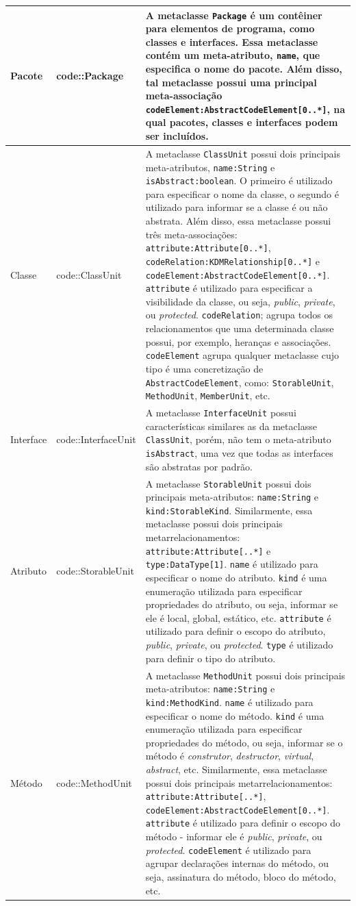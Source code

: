 \begin{longtable}[c]{| m{1.9cm} | m{3.57cm}| m{9.3cm} |}
 Pacote & code::Package & A metaclasse \texttt{Package} é um contêiner para elementos de programa, como classes e interfaces. Essa metaclasse contém um meta-atributo, \texttt{name}, que especifica o nome do pacote. Além disso, tal metaclasse possui uma principal meta-associação \texttt{codeElement:AbstractCodeElement[0..*]}, na qual pacotes, classes e interfaces podem ser incluídos. \\ 
\hline
Classe & code::ClassUnit & A metaclasse \texttt{ClassUnit} possui dois principais meta-atributos,  \texttt{name:String} e \texttt{isAbstract:boolean}. O primeiro é utilizado para especificar o nome da classe, o segundo é utilizado para informar se a classe é ou não abstrata. Além disso, essa metaclasse possui três meta-associações: \texttt{attribute:Attribute[0..*]}, \texttt{codeRelation:KDMRelationship[0..*]} e  \texttt{codeElement:AbstractCodeElement[0..*]}. \texttt{attribute} é utilizado para especificar a  visibilidade da classe, ou seja, \textit{public}, \textit{private}, ou \textit{protected}. \texttt{codeRelation}; agrupa todos os relacionamentos que uma determinada classe possui, por exemplo, heranças e associações. \texttt{codeElement} agrupa qualquer metaclasse cujo tipo é uma concretização de \texttt{AbstractCodeElement}, como: \texttt{StorableUnit}, \texttt{MethodUnit}, \texttt{MemberUnit}, etc. \\ 
\hline
Interface & code::InterfaceUnit & A metaclasse \texttt{InterfaceUnit} possui características similares as da metaclasse \texttt{ClassUnit}, porém, não tem o meta-atributo \texttt{isAbstract}, uma vez que todas as interfaces são abstratas por padrão. \\ 
\hline
Atributo & code::StorableUnit & A metaclasse \texttt{StorableUnit} possui dois principais meta-atributos: \texttt{name:String} e \texttt{kind:StorableKind}. Similarmente, essa metaclasse possui dois principais metarrelacionamentos: \texttt{attribute:Attribute[..*]} e \texttt{type:DataType[1]}. \texttt{name} é utilizado para especificar o nome do atributo. \texttt{kind} é uma enumeração utilizada para especificar propriedades do atributo, ou seja, informar se ele é local, global, estático, etc. \texttt{attribute} é utilizado para definir o escopo do atributo, \textit{public}, \textit{private}, ou \textit{protected}. \texttt{type} é utilizado para definir o tipo do atributo.  \\ 
\hline
Método & code::MethodUnit & A metaclasse \texttt{MethodUnit} possui dois principais meta-atributos: \texttt{name:String} e \texttt{kind:MethodKind}. \texttt{name} é utilizado para especificar o nome do método. \texttt{kind} é uma enumeração utilizada para especificar propriedades do método, ou seja, informar se o método é \textit{construtor}, \textit{destructor}, \textit{virtual}, \textit{abstract}, etc. Similarmente, essa metaclasse possui dois principais metarrelacionamentos: \texttt{attribute:Attribute[..*]}, \texttt{codeElement:AbstractCodeElement[0..*]}. \texttt{attribute} é utilizado para definir o escopo do método - informar ele é \textit{public}, \textit{private}, ou \textit{protected}. \texttt{codeElement} é utilizado para agrupar declarações internas do método, ou seja, assinatura do método, bloco do método, etc.\\ 

\end{longtable}
